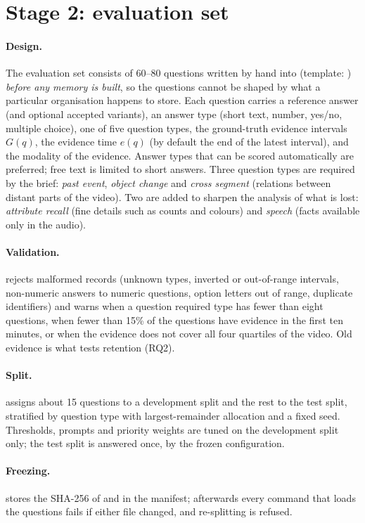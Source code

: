 \section{Stage 2: evaluation set}\label{sec:stage2}

\paragraph{Design.}
The evaluation set consists of 60--80 questions written by hand into
 (template:
) \emph{before any memory is built}, so the
questions cannot be shaped by what a particular organisation happens to store.
Each question carries a reference answer (and optional accepted variants), an
answer type (short text, number, yes/no, multiple choice), one of five
question types, the ground-truth evidence intervals
$G(q)$, the evidence time $e(q)$ (by default the end of the latest interval),
and the modality of the evidence. Answer types that can be scored
automatically are preferred; free text is limited to short answers. Three
question types are required by the brief: \emph{past event}, \emph{object
change} and \emph{cross segment} (relations between distant parts of the
video). Two are added to sharpen the analysis of what is lost:
\emph{attribute recall} (fine details such as counts and colours) and
\emph{speech} (facts available only in the audio).

\paragraph{Validation.}
 rejects malformed records (unknown types,
inverted or out-of-range intervals, non-numeric answers to numeric questions,
option letters out of range, duplicate identifiers) and warns when a question
required type has fewer than eight questions, when fewer than 15\% of the questions have
evidence in the first ten minutes, or when the evidence does not cover all four
quartiles of the video. Old evidence is what tests retention (RQ2).

\paragraph{Split.}
 assigns about 15 questions to a development split
and the rest to the test split, stratified by question type with
largest-remainder allocation and a fixed seed. Thresholds, prompts and
priority weights are tuned on the development split only; the test split is
answered once, by the frozen configuration.

\paragraph{Freezing.}
 stores the SHA-256 of  and
 in the manifest; afterwards every command that loads the
questions fails if either file changed, and re-splitting is refused.

